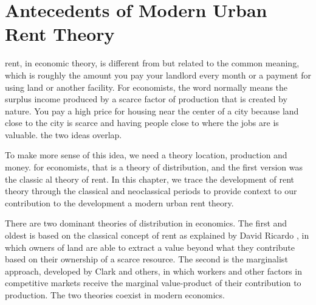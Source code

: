\chapter{Antecedents of Modern Urban Rent Theory} \label{chapter-rent}


\Gls{rent}, in economic theory, is different from but related to the common  meaning, which is roughly the amount you pay your landlord every month or a payment for using land or another facility.  For economists, the word normally means the  \gls{surplus} income produced by a scarce factor of production that is created by nature. You pay a high price for housing near the center of a city because land close to the city is scarce and having people close to where the jobs are is valuable. the two ideas overlap.

To make more sense of this idea, we need a theory location, production and money. 
for economists, that is a theory of distribution, and the first version was the classic al theory of rent. In this chapter, we trace the development of rent theory through the classical and neoclassical periods to provide context to our contribution to the development a modern urban rent theory. 


There are two dominant theories of \gls{distribution} in economics. The first and oldest is based on the classical concept of rent as explained  by David Ricardo \cite{ricardoEssayInfluenceLow1815}, in which owners of land are able to extract a value beyond what they contribute based on their ownership of a scarce resource. 
The second is the marginalist approach, developed by Clark and others, in which workers and other factors  in competitive markets receive the \gls{marginal value-product} of their contribution to production. The two theories coexist in modern economics.

